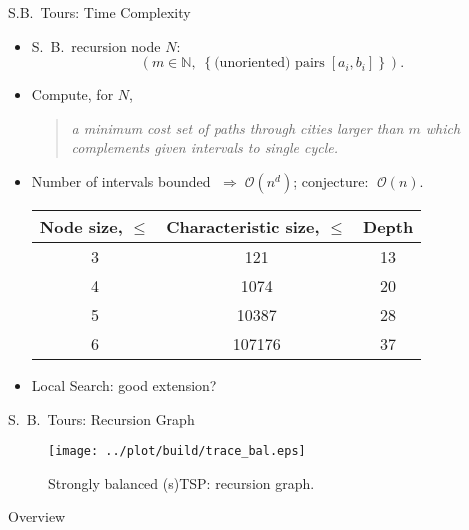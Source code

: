 \documentclass[
  size=10pt,
  style=klope,
  paper=screen,
  pauseslide,
  nopagebreaks,
  fleqn
]{powerdot}
\begin{document}
\begin{slide}[toc=]{S.B.\ Tours: Time Complexity}
  \begin{itemize}
  \item
    S.\ B.\ recursion node $N$:
    \begin{equation}
    \left(m \in \mathbb{N}, \;
      \left\{ \text{(unoriented) pairs} \; [a_i,b_i] \right\} \right).
    \end{equation}
    \vspace{-5mm}
  \item
    Compute, for $N$,
    \begin{quote}
    {\small \itshape
      a minimum cost set of paths through cities larger than $m$
      which complements given intervals to single cycle.
    }
    \end{quote}
  \item
    Number of intervals bounded $\;\Rightarrow\; \mathcal{O}\left(n^d\right)$;
    conjecture: $\;\mathcal{O}\left(n\right)$. %
    {\small
    \begin{table}[htpb]
    \centering
    \begin{tabular}{cSc}
      \toprule
      {\bfseries Node size, $\leq$ } &
      {\bfseries Characteristic size, $\leq$} &
      {\bfseries Depth } \\
      \midrule
      3 &    121 & 13 \\
      4 &   1074 & 20 \\
      5 &  10387 & 28 \\
      6 & 107176 & 37 \\
      \bottomrule
    \end{tabular}
    \end{table}
    }
  \item
  Local Search: good extension?
  \end{itemize}
\end{slide}

\begin{slide}[toc=]{S.\ B.\ Tours: Recursion Graph}
  \begin{figure}[H]
    \centering
    \texttt{[image: ../plot/build/trace\_bal.eps]}
    \caption{Strongly balanced (s)TSP: recursion graph.}
  \end{figure}
\end{slide}

\begin{slide}[toc=,bm=]{Overview}
\tableofcontents[content=currentsection,type=1]
\end{slide}
\end{document}
